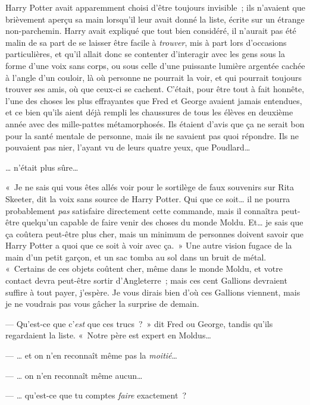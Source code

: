 \later

Harry Potter avait apparemment choisi d'être toujours invisible~; ils n'avaient que brièvement aperçu sa main lorsqu'il leur avait donné la liste, écrite sur un étrange non-parchemin.
Harry avait expliqué que tout bien considéré, il n'aurait pas été malin de sa part de se laisser être facile à \emph{trouver}, mis à part lors d'occasions particulières, et qu'il allait donc se contenter d'interagir avec les gens sous la forme d'une voix sans corps, ou sous celle d'une puissante lumière argentée cachée à l'angle d'un couloir, là où personne ne pourrait la voir, et qui pourrait toujours trouver ses amis, où que ceux-ci se cachent.
C'était, pour être tout à fait honnête, l'une des choses les plus effrayantes que Fred et George avaient jamais entendues, et ce bien qu'ils aient déjà rempli les chaussures de tous les élèves en deuxième année avec des mille-pattes métamorphosés.
Ils étaient d'avis que ça ne serait bon pour la santé mentale de personne, mais ils ne savaient pas quoi répondre.
Ils ne pouvaient pas nier, l'ayant vu de leurs quatre yeux, que Poudlard…

… n'était plus sûre…

«~Je ne sais qui vous êtes allés voir pour le sortilège de faux souvenirs sur Rita Skeeter, dit la voix sans source de Harry Potter.
Qui que ce soit… il ne pourra probablement \emph{pas} satisfaire directement cette commande, mais il connaîtra peut-être quelqu'un capable de faire venir des choses du monde Moldu.
Et… je sais que ça coûtera peut-être plus cher, mais un minimum de personnes doivent savoir que Harry Potter a quoi que ce soit à voir avec ça.~»
Une autre vision fugace de la main d'un petit garçon, et un sac tomba au sol dans un bruit de métal.
«~Certains de ces objets coûtent cher, même dans le monde Moldu, et votre contact devra peut-être sortir d'Angleterre~; mais ces cent Gallions devraient suffire à tout payer, j'espère.
Je vous dirais bien d'où ces Gallions viennent, mais je ne voudrais pas vous gâcher la surprise de demain.

--- Qu'est-ce que c'\emph{est} que ces trucs~?~»
dit Fred ou George, tandis qu'ils regardaient la liste.
«~Notre père est expert en Moldus…

--- … et on n'en reconnaît même pas la \emph{moitié}…

--- … on n'en reconnaît même aucun…

--- … qu'est-ce que tu comptes \emph{faire} exactement~?

